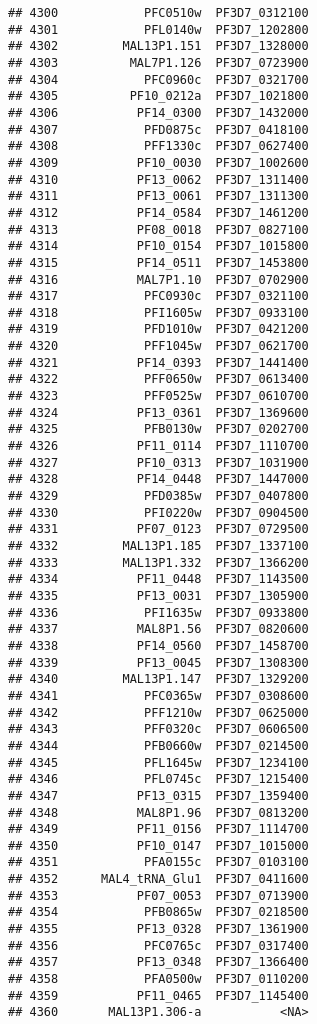 \documentclass[12pt, a4paper]{article}\usepackage[]{graphicx}\usepackage[]{color}
\makeatletter
\newenvironment{kframe}{%
 \def\at@end@of@kframe{}%
 \ifinner\ifhmode%
  \def\at@end@of@kframe{\end{minipage}}%
  \begin{minipage}{\columnwidth}%
 \fi\fi%
 \def\FrameCommand##1{\hskip\@totalleftmargin \hskip-\fboxsep
 \colorbox{shadecolor}{##1}\hskip-\fboxsep
     \hskip-\linewidth \hskip-\@totalleftmargin \hskip\columnwidth}%
 \MakeFramed {\advance\hsize-\width
   \@totalleftmargin\z@ \linewidth\hsize
   \@setminipage}}%
 {\par\unskip\endMakeFramed%
 \at@end@of@kframe}
\newenvironment{knitrout}{}{} %
\makeatother
\begin{document}
\begin{knitrout}
\begin{kframe}
\begin{verbatim}
## 4300            PFC0510w  PF3D7_0312100
## 4301            PFL0140w  PF3D7_1202800
## 4302         MAL13P1.151  PF3D7_1328000
## 4303          MAL7P1.126  PF3D7_0723900
## 4304            PFC0960c  PF3D7_0321700
## 4305          PF10_0212a  PF3D7_1021800
## 4306           PF14_0300  PF3D7_1432000
## 4307            PFD0875c  PF3D7_0418100
## 4308            PFF1330c  PF3D7_0627400
## 4309           PF10_0030  PF3D7_1002600
## 4310           PF13_0062  PF3D7_1311400
## 4311           PF13_0061  PF3D7_1311300
## 4312           PF14_0584  PF3D7_1461200
## 4313           PF08_0018  PF3D7_0827100
## 4314           PF10_0154  PF3D7_1015800
## 4315           PF14_0511  PF3D7_1453800
## 4316           MAL7P1.10  PF3D7_0702900
## 4317            PFC0930c  PF3D7_0321100
## 4318            PFI1605w  PF3D7_0933100
## 4319            PFD1010w  PF3D7_0421200
## 4320            PFF1045w  PF3D7_0621700
## 4321           PF14_0393  PF3D7_1441400
## 4322            PFF0650w  PF3D7_0613400
## 4323            PFF0525w  PF3D7_0610700
## 4324           PF13_0361  PF3D7_1369600
## 4325            PFB0130w  PF3D7_0202700
## 4326           PF11_0114  PF3D7_1110700
## 4327           PF10_0313  PF3D7_1031900
## 4328           PF14_0448  PF3D7_1447000
## 4329            PFD0385w  PF3D7_0407800
## 4330            PFI0220w  PF3D7_0904500
## 4331           PF07_0123  PF3D7_0729500
## 4332         MAL13P1.185  PF3D7_1337100
## 4333         MAL13P1.332  PF3D7_1366200
## 4334           PF11_0448  PF3D7_1143500
## 4335           PF13_0031  PF3D7_1305900
## 4336            PFI1635w  PF3D7_0933800
## 4337           MAL8P1.56  PF3D7_0820600
## 4338           PF14_0560  PF3D7_1458700
## 4339           PF13_0045  PF3D7_1308300
## 4340         MAL13P1.147  PF3D7_1329200
## 4341            PFC0365w  PF3D7_0308600
## 4342            PFF1210w  PF3D7_0625000
## 4343            PFF0320c  PF3D7_0606500
## 4344            PFB0660w  PF3D7_0214500
## 4345            PFL1645w  PF3D7_1234100
## 4346            PFL0745c  PF3D7_1215400
## 4347           PF13_0315  PF3D7_1359400
## 4348           MAL8P1.96  PF3D7_0813200
## 4349           PF11_0156  PF3D7_1114700
## 4350           PF10_0147  PF3D7_1015000
## 4351            PFA0155c  PF3D7_0103100
## 4352      MAL4_tRNA_Glu1  PF3D7_0411600
## 4353           PF07_0053  PF3D7_0713900
## 4354            PFB0865w  PF3D7_0218500
## 4355           PF13_0328  PF3D7_1361900
## 4356            PFC0765c  PF3D7_0317400
## 4357           PF13_0348  PF3D7_1366400
## 4358            PFA0500w  PF3D7_0110200
## 4359           PF11_0465  PF3D7_1145400
## 4360       MAL13P1.306-a           <NA>

\end{verbatim}
\end{kframe}
\end{knitrout}
\end{document}
